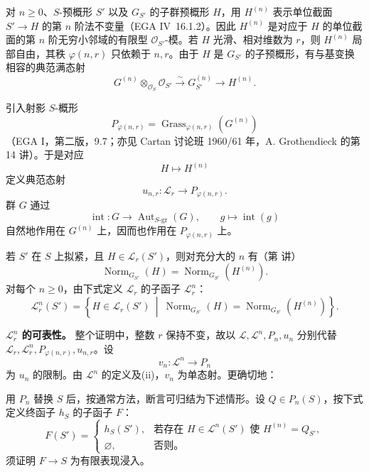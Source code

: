 对 \(n\geq0\)、\(S\)-预概形 \(S'\) 以及 \(G_{S'}\) 的子群预概形 \(H\)，用 \(H^{(n)}\) 表示单位截面 \(S'\to H\) 的第 \(n\) 阶法不变量（EGA IV~16.1.2）。因此 \(H^{(n)}\) 是对应于 \(H\) 的单位截面的第 \(n\) 阶无穷小邻域的有限型 \(\mathcal O_{S'}\)-模。若 \(H\) 光滑、相对维数为 \(r\)，则 \(H^{(n)}\) 局部自由，其秩 \(\varphi(n,r)\) 只依赖于 \(n,r\)。由于 \(H\) 是 \(G_{S'}\) 的子预概形，有与基变换相容的典范满态射
\[
 G^{(n)}\otimes_{\mathcal O_S}\mathcal O_{S'}
 \xrightarrow{\sim}G_{S'}^{(n)}
 \longrightarrow H^{(n)}.
\]

引入射影 \(S\)-概形
\[
  P_{\varphi(n,r)}
   =\operatorname{Grass}_{\varphi(n,r)}(G^{(n)})
\]
（EGA I，第二版，9.7；亦见 Cartan 讨论班 1960/61 年，A. Grothendieck 的第 14 讲）。于是对应
\[
  H\longmapsto H^{(n)}
\]
定义典范态射
\[
  u_{n,r}:\mathcal L_r\longrightarrow P_{\varphi(n,r)}.
\]
群 \(G\) 通过
\[
 \operatorname{int}:G\longrightarrow
 \operatorname{Aut}_{S\text{-}\mathrm{gr}}(G),
 \qquad g\longmapsto\operatorname{int}(g)
\]
自然地作用在 \(G^{(n)}\) 上，因而也作用在 \(P_{\varphi(n,r)}\) 上。

若 \(S'\) 在 \(S\) 上拟紧，且 \(H\in\mathcal L_r(S')\)，则对充分大的 \(n\) 有（第  讲）
\[
 \operatorname{Norm}_{G_{S'}}(H)
 =\operatorname{Norm}_{G_{S'}}(H^{(n)}).
\]
对每个 \(n\geq0\)，由下式定义 \(\mathcal L_r\) 的子函子 \(\mathcal L_r^n\)：
\[
\mathcal L_r^n(S')=
\left\{
 H\in\mathcal L_r(S')\ \middle|\
 \operatorname{Norm}_{G_{S'}}(H)
 =\operatorname{Norm}_{G_{S'}}(H^{(n)})
\right\}.
\]

\medskip\noindent
\textbf{\(\mathcal L_r^n\) 的可表性。}
整个证明中，整数 \(r\) 保持不变，故以 \(\mathcal L,\mathcal L^n,P_n,u_n\) 分别代替 \(\mathcal L_r,\mathcal L_r^n,P_{\varphi(n,r)},u_{n,r}\)。设
\[
 v_n:\mathcal L^n\longrightarrow P_n
\]
为 \(u_n\) 的限制。由 \(\mathcal L^n\) 的定义及(ii)，\(v_n\) 为单态射。更确切地：

\SGARefTarget{sga3:xv:lemma:5:3}

用 \(P_n\) 替换 \(S\) 后，按通常方法，断言可归结为下述情形。设 \(Q\in P_n(S)\)，按下式定义终函子 \(h_S\) 的子函子 \(F\)：
\[
F(S')=
\begin{cases}
h_S(S'),&\text{若存在 }H\in\mathcal L^n(S')
                    \text{ 使 }H^{(n)}=Q_{S'},\\
\varnothing,&\text{否则。}
\end{cases}
\]
须证明 \(F\to S\) 为有限表现浸入。

